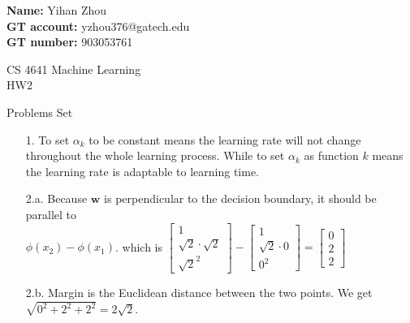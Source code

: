 \documentclass[12pt]{article}
\begin{document}
\noindent
\textbf{Name:} Yihan Zhou \smallskip  \\
\textbf{GT account:} yzhou376@gatech.edu\smallskip \\ 
\textbf{GT number:} 903053761\smallskip \\ 

\begin{center}
{
CS 4641  Machine Learning \\
HW2 \\

}

\end{center}

Problems Set

\begin{itemize}



\item[1.] \smallskip To set $\alpha_k$ to be constant means the learning rate will not change throughout the whole learning process. While to set $\alpha_k$ as function $k$ means the learning rate is adaptable to learning time.

\end{itemize}

\begin{itemize}

\item[2.a. ] \smallskip Because $\textbf{w}$ is perpendicular to the decision boundary, it should be parallel to \\  $\phi(x_2) - \phi(x_1)$. which is $
\left[\begin{array}{c} 
1 \\ \sqrt{2} \cdot \sqrt{2} \\ \sqrt{2}^2
\end{array}\right] - 
\left[\begin{array}{c} 
1 \\ \sqrt{2}\cdot0 \\ 0^2
\end{array}\right] 
= 
\left[\begin{array}{c} 
0 \\ 2 \\ 2
\end{array}\right] $  

\end{itemize}

\begin{itemize}

\item[2.b. ] \smallskip Margin is the Euclidean distance between the two points. We get $\sqrt{0^2 + 2^2 + 2^2} = 2\sqrt{2}$.

\end{itemize}
\end{document}
